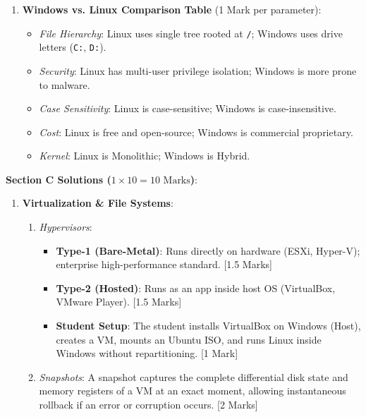 \begin{solutionbox}
\begin{enumerate}[start=6]
    \item \textbf{Windows vs. Linux Comparison Table} (1 Mark per parameter):
    \begin{itemize}
        \item \textit{File Hierarchy}: Linux uses single tree rooted at \texttt{/}; Windows uses drive letters (\texttt{C:}, \texttt{D:}).
        \item \textit{Security}: Linux has multi-user privilege isolation; Windows is more prone to malware.
        \item \textit{Case Sensitivity}: Linux is case-sensitive; Windows is case-insensitive.
        \item \textit{Cost}: Linux is free and open-source; Windows is commercial proprietary.
        \item \textit{Kernel}: Linux is Monolithic; Windows is Hybrid.
    \end{itemize}
\end{enumerate}

\medskip
\noindent\textbf{Section C Solutions ($1 \times 10 = 10\text{ Marks}$)}:
\begin{enumerate}[start=8]
    \item \textbf{Virtualization \& File Systems}:
    \begin{enumerate}[label=(\alph*)]
        \item \textit{Hypervisors}:
        \begin{itemize}
            \item \textbf{Type-1 (Bare-Metal)}: Runs directly on hardware (ESXi, Hyper-V); enterprise high-performance standard. [1.5 Marks]
            \item \textbf{Type-2 (Hosted)}: Runs as an app inside host OS (VirtualBox, VMware Player). [1.5 Marks]
            \item \textbf{Student Setup}: The student installs VirtualBox on Windows (Host), creates a VM, mounts an Ubuntu ISO, and runs Linux inside Windows without repartitioning. [1 Mark]
        \end{itemize}

        \item \textit{Snapshots}:
        A snapshot captures the complete differential disk state and memory registers of a VM at an exact moment, allowing instantaneous rollback if an error or corruption occurs. [2 Marks]


\end{enumerate}
\end{enumerate}
\end{solutionbox}
